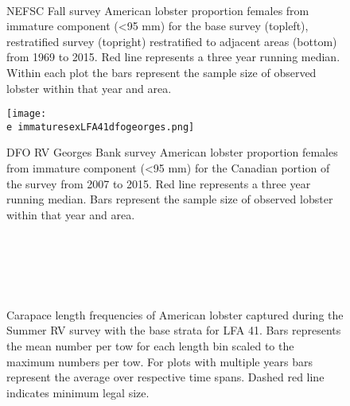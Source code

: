 \documentclass[11pt]{article}
\newcommand{\D}{.}
\newcommand{\e}{/backup/bio_data/bio.lobster/figures/} %
\begin{document}
\begin{figure}
\centering
{}
\\
\caption{NEFSC Fall survey American lobster proportion females from immature component (\textless 95 mm) for the base survey (topleft), restratified survey (topright) restratified to adjacent areas (bottom) from 1969 to 2015. Red line represents a three year running median. Within each plot the bars represent the sample size of observed lobster within that year and area. }
\end{figure}
\clearpage


\begin{figure}

    \texttt{[image: \\e immaturesexLFA41dfogeorges.png]}
    \caption{DFO RV Georges Bank survey American lobster proportion females from immature component (\textless 95 mm) for the Canadian portion of the survey from 2007 to 2015. Red line represents a three year running median. Bars represent the sample size of observed lobster within that year and area.}

\end{figure}





\begin{figure}
\centering

\\
\\
\\
\\
 \caption{Carapace length frequencies of American lobster captured during the Summer RV survey with the base strata for LFA 41. Bars represents the mean number per tow for each length bin scaled to the maximum numbers per tow. For plots with multiple years bars represent the average over respective time spans. Dashed red line indicates minimum legal size.}
\end{figure}
\clearpage
\end{document}
